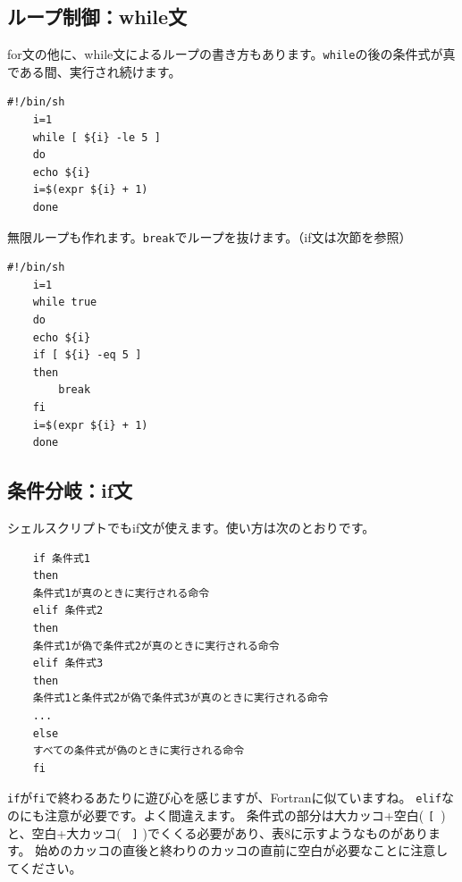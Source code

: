 \documentclass[a4j]{ltjreport}
\begin{document}
    \subsection{ループ制御：while文}
    for文の他に、while文によるループの書き方もあります。\texttt{while}の後の条件式が真である間、実行され続けます。
    \begin{lstlisting}[caption=sample07.sh 改4]
    #!/bin/sh
    i=1
    while [ ${i} -le 5 ]
    do
    echo ${i}
    i=$(expr ${i} + 1)
    done
    \end{lstlisting}
    無限ループも作れます。\texttt{break}でループを抜けます。（if文は次節を参照）
    \begin{lstlisting}[caption=sample07.sh 改5]
    #!/bin/sh
    i=1
    while true
    do
    echo ${i}
    if [ ${i} -eq 5 ]
    then
        break
    fi
    i=$(expr ${i} + 1)
    done
    \end{lstlisting}
    
    \subsection{条件分岐：if文}

    シェルスクリプトでもif文が使えます。使い方は次のとおりです。
    \begin{lstlisting}
    if 条件式1
    then
    条件式1が真のときに実行される命令
    elif 条件式2
    then
    条件式1が偽で条件式2が真のときに実行される命令
    elif 条件式3
    then
    条件式1と条件式2が偽で条件式3が真のときに実行される命令
    ...
    else
    すべての条件式が偽のときに実行される命令
    fi
    \end{lstlisting}
    \texttt{if}が\texttt{fi}で終わるあたりに遊び心を感じますが、Fortranに似ていますね。
    \texttt{elif}なのにも注意が必要です。よく間違えます。
    条件式の部分は大カッコ+空白( \verb*|[ |)と、空白+大カッコ( \verb*| ]| )でくくる必要があり、表8に示すようなものがあります。
    始めのカッコの直後と終わりのカッコの直前に空白が必要なことに注意してください。
\end{document}
